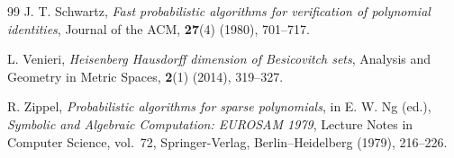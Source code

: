 \documentclass[11pt,letterpaper]{amsart}
\numberwithin{equation}{section}
\theoremstyle{definition}
\theoremstyle{remark}
\begin{document}
\begin{thebibliography}{99}
J. T. Schwartz,
\emph{Fast probabilistic algorithms for verification of polynomial
identities}, Journal of the ACM, \textbf{27}(4) (1980),
701--717.

L. Venieri,
\emph{Heisenberg Hausdorff dimension of Besicovitch sets},
Analysis and Geometry in Metric Spaces, \textbf{2}(1) (2014),
319--327.

R. Zippel,
\emph{Probabilistic algorithms for sparse polynomials},
in E. W. Ng (ed.),
\emph{Symbolic and Algebraic Computation: EUROSAM 1979},
Lecture Notes in Computer Science, vol.~72,
Springer-Verlag, Berlin--Heidelberg (1979), 216--226.

\end{thebibliography}
\end{document}
